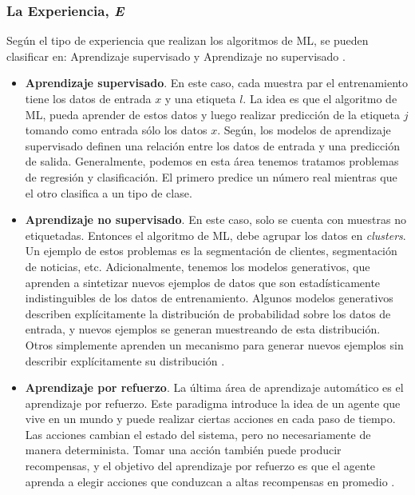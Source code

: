 \subsubsection{La Experiencia, \textit{E}}

Según el tipo de experiencia que realizan los algoritmos de ML, se pueden clasificar en: Aprendizaje supervisado y Aprendizaje no supervisado \cite{Goodfellow2016}.

\begin{itemize}
	\item \textbf{Aprendizaje supervisado}. En este caso, cada muestra par el entrenamiento tiene los datos de entrada $x$ y una etiqueta $l$. La idea es que el algoritmo de ML, pueda aprender de estos datos y luego realizar predicción de la etiqueta $j$ tomando como entrada sólo los datos $x$. Según, \cite{prince2023understanding} los modelos de aprendizaje supervisado definen una relación entre los datos de entrada y una predicción de salida. Generalmente, podemos en esta área tenemos tratamos problemas de regresión y clasificación. El primero predice un número real mientras que el otro clasifica a un tipo de clase.
	
	\item \textbf{Aprendizaje no supervisado}. En este caso, solo se cuenta con muestras no etiquetadas. Entonces el algoritmo   de ML, debe agrupar los datos en \textit{clusters}. Un ejemplo de estos problemas es la segmentación de clientes, segmentación de noticias, etc. Adicionalmente, tenemos los modelos generativos, que aprenden a sintetizar nuevos ejemplos de datos que son estadísticamente indistinguibles de los datos de entrenamiento. Algunos modelos generativos describen explícitamente la distribución de probabilidad sobre los datos de entrada, y nuevos ejemplos se generan muestreando de esta distribución. Otros simplemente aprenden un mecanismo para generar nuevos ejemplos sin describir explícitamente su distribución \citep{prince2023understanding}.
	
	\item \textbf{Aprendizaje por refuerzo}. La última área de aprendizaje automático es el aprendizaje por refuerzo. Este paradigma introduce la idea de un agente que vive en un mundo y puede realizar ciertas acciones en cada paso de tiempo. Las acciones cambian el estado del sistema, pero no necesariamente de manera determinista. Tomar una acción también puede producir recompensas, y el objetivo del aprendizaje por refuerzo es que el agente aprenda a elegir acciones que conduzcan a altas recompensas en promedio \citep{prince2023understanding}.
	
\end{itemize}


